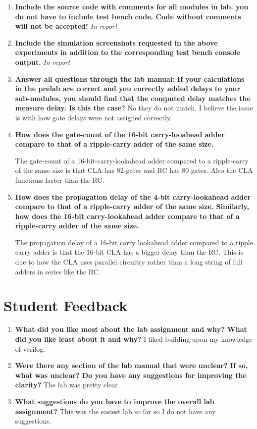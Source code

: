\documentclass[a4paper,12pt]{article}
\begin{document}
\begin{enumerate}
  \item \textbf{Include the source code with comments for all modules in lab. you do not have to include test bench code. Code without comments will not be accepted!}
    \textit{In report}
  \item \textbf{Include the simulation screenshots requested in the above experiments in addition to the corresponding test bench console output.}
      \textit{In report}
  \item \textbf{Answer all questions through the lab manual: If your calculations in the prelab are correct and you correctly added delays to your sub-modules,
you should find that the computed delay matches the measure delay. Is this the case?}
  No they do not match. I believe the issue is with how gate delays were not assigned correctly.
  
  \item \textbf{How does the gate-count of the 16-bit carry-looahead adder compare to that of a ripple-carry adder of the same size.}
  
  The gate-count of a 16-bit-carry-lookahead adder compared to a ripple-carry of the same size is that CLA has 82-gates and RC has 80 gates. Also the CLA functions faster than the RC.
  
  \item \textbf{How does the propagation delay of the 4-bit carry-lookahead adder compare to that of a ripple-carry adder of the same size. Similarly, how does the 16-bit carry-lookahead adder compare to that of a ripple-carry adder of the same size.}
  
  The propagation delay of a 16-bit carry lookahead adder compared to a ripple carry adder is that the 16-bit CLA has a bigger delay than the RC. This is due to how the CLA uses parallel circuitry rather than a long string of full adders in series like the RC.
  
\end{enumerate}

\section*{Student Feedback}

\begin{enumerate}
  \item \textbf{What did you like most about the lab assignment and why? What did you like least about it and why?}
  I liked building upon my knowledge of verilog.

  \item \textbf{Were there any section of the lab manual that were unclear? If so, what was unclear? Do you have any suggestions for improving the clarity?}
  The lab was pretty clear

  \item \textbf{What suggestions do you have to improve the overall lab assignment?}
  This was the easiest lab so far so I do not have any suggestions.

\end{enumerate}
\end{document}
